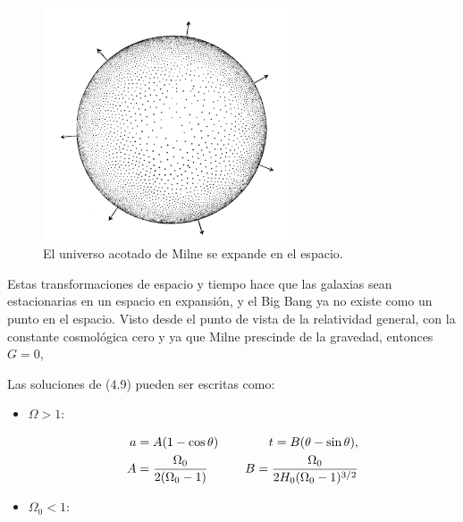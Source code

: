 \documentclass[11pt]{article}
\begin{document}
{{    \newpage


   \begin{figure}                  \includegraphics[width=0.65\textwidth]{milne_model.png}
        \caption{\footnotesize{El universo acotado de Milne se expande en el espacio.}}
    \end{figure}

 
Estas transformaciones de espacio y tiempo hace que las galaxias sean estacionarias en un espacio en expansión, y el Big Bang ya no existe como un punto en el espacio. Visto desde el punto de vista de la relatividad general, con la constante cosmológica cero y ya que Milne prescinde de la gravedad, entonces $G =0$, 

         \vspace{5cm}


    Las soluciones de (4.9) pueden ser escritas como: 
    
 

    
   \begin{itemize}

     \item $\Omega > 1$: 

        \begin{align}
            a & =A (1 - \cos \theta) \hspace{0.4cm} & t  = B(\theta - \sin \theta), \\
             A & = \frac{\Omega_0}{2(\Omega_0 -1 )} \hspace{0.4cm} & B  = \frac{\Omega_0}{2H_0( \Omega_0 - 1)^{3/2}}
        \end{align}
        
    \item $\Omega_0 <1$:


\end{itemize}}}
\end{document}
